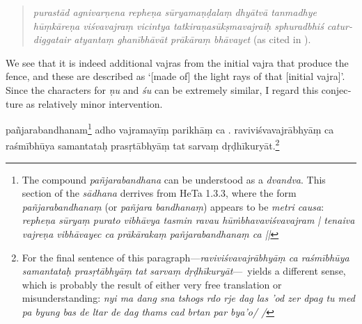 \documentclass[naipra.tex]{subfiles}
\begin{document}
\begin{sanskrit}
{\begin{english}
	\begin{quote}
		\emph{purastād agnivarṇena repheṇa sūryamaṇḍalaṃ dhyātvā tanmadhye hūṃkāreṇa viśvavajraṃ vicintya tatkiraṇasūkṣmavajraiḥ sphuradbhiś caturdiggatair atyantaṃ ghanībhāvāt prākāraṃ bhāvayet} (as cited in \cite[293]{isaacson2007}).
	\end{quote}
	
	\noindent We see that it is indeed additional vajras from the initial vajra that produce the fence, and these are described as `[made of] the light rays of that [initial vajra]'.
	Since the characters for \emph{ṇu} and \emph{śu} can be extremely similar, I regard this conjecture as relatively minor intervention.
\end{english}}  pañjarabandhanam\footnote{
	The compound \emph{pañjarabandhana} can be understood as a \emph{dvandva}.
	This section of the \emph{sādhana} derrives from HeTa 1.3.3, where the form \emph{pañjarabandhanaṃ} (or \emph{pañjara bandhanaṃ}) appears to be \emph{metri causa}: \emph{repheṇa sūryaṃ purato vibhāvya tasmin ravau hūṁbhavaviśvavajram | tenaiva vajreṇa vibhāvayec ca prākārakaṃ pañjarabandhanaṃ ca ||}
} adho vajramayīṃ  parikhāṃ ca .
raviviśvavajrābhyāṃ ca raśmībhūya samantataḥ prasṛtābhyāṃ tat sarvaṃ dṛḍhīkuryāt.\footnote{
	For the final sentence of this paragraph—\emph{raviviśvavajrābhyāṃ ca raśmībhūya samantataḥ prasṛtābhyāṃ tat sarvaṃ dṛḍhīkuryāt}—\TIB\ yields a different sense, which is probably the result of either very free translation or misunderstanding: \emph{nyi ma dang sna tshogs rdo rje dag las 'od zer dpag tu med pa byung bas de ltar de dag thams cad brtan par bya'o/ /}
}
\pend




\end{sanskrit}
\end{document}

